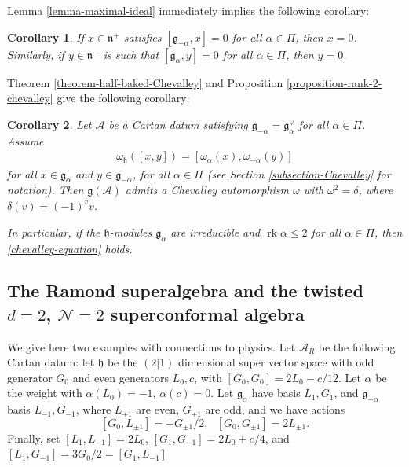 \documentclass[12pt, a4paper, reqno]{amsart}
\def\AA{\mathcal{A}}
\def\NN{\mathcal{N}}
\def\g{\mathfrak{g}}
\def\h{\mathfrak{h}}
\def\ol{\overline}
\def\rk{\operatorname{rk}}
\newtheorem{corollary}{Corollary}
\theoremstyle{definition}
\theoremstyle{definition}
\theoremstyle{definition}
\numberwithin{theorem}{section}
\numberwithin{lemma}{section}
\numberwithin{remark}{section}
\numberwithin{definition}{section}
\numberwithin{corollary}{section}
\numberwithin{proposition}{section}
\numberwithin{example}{section}
\begin{document}
	Lemma \ref{lemma-maximal-ideal} immediately implies the following corollary:
	\begin{corollary}\label{corollary-maximal-ideal}
		If \(x \in \mathfrak{n}^+\) satisfies \([\mathfrak{g}_{-\alpha},x] = 0\) for all \(\alpha \in \Pi\), then \(x = 0\). Similarly, if \(y \in \mathfrak{n}^-\) is such that \([\mathfrak{g}_{\alpha},y] = 0\) for all \(\alpha \in \Pi\), then \(y=0\). 
	\end{corollary}
	
	Theorem \ref{theorem-half-baked-Chevalley} and Proposition \ref{proposition-rank-2-chevalley} give the following corollary:
	
	\begin{corollary}\label{corollary-Chevalley}
		Let \(\mathcal{A}\) be a Cartan datum satisfying \(\mathfrak{g}_{-\alpha} = \mathfrak{g}_{\alpha}^\vee\) for all \(\alpha \in \Pi\). Assume
		\begin{align}\label{chevalley-equation}
			\omega_{\mathfrak{h}}([x,y]) = [\omega_{\alpha}(x),\omega_{-\alpha}(y)]
		\end{align} 
		for all \(x \in \mathfrak{g}_{\alpha}\) and \(y \in \mathfrak{g}_{-\alpha}\), for all \(\alpha \in \Pi\) (see Section \ref{subsection-Chevalley} for notation). Then \(\mathfrak{g}(\mathcal{A})\) admits a Chevalley automorphism $\omega$ with $\omega^2=\delta$, where $\delta(v)=(-1)^{\ol{v}}v$.
		
		In particular, if the \(\mathfrak{h}\)-modules \(\mathfrak{g}_{\alpha}\) are irreducible and \(\rk\alpha \leq 2\) for all \(\alpha \in \Pi\), then \eqref{chevalley-equation} holds.
	\end{corollary}

	\subsection{The Ramond superalgebra and the twisted $d=2$, $\NN=2$ superconformal algebra}\label{section ramond} We give here two examples with connections to physics. Let $\AA_{R}$ be the following Cartan datum: let $\h$ be the $(2|1)$ dimensional super vector space with odd generator $G_0$ and even generators $L_0,c$, with $[G_0,G_0]=2L_0-c/12$.  Let $\alpha$ be the weight with $\alpha(L_0)=-1$, $\alpha(c)=0$.  Let $\g_{\alpha}$ have basis $L_1,G_1$, and $\g_{-\alpha}$ basis $L_{-1},G_{-1}$, where $L_{\pm1}$ are even, $G_{\pm1}$ are odd, and we have actions
	\[
	[G_0,L_{\pm1}]=\mp G_{\pm1}/2, \ \ \ [G_0,G_{\pm1}]=2L_{\pm1}.
	\]
	Finally, set $[L_1,L_{-1}]=2L_0$, $[G_{1},G_{-1}]=2L_0+c/4$, and $[L_1,G_{-1}]=3G_0/2=[G_1,L_{-1}]$
	
\end{document}
